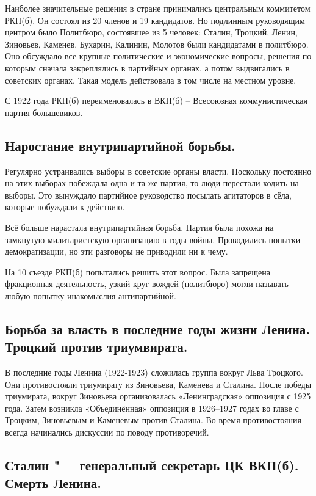 Наиболее значительные решения в стране принимались центральным коммитетом РКП(б). Он состоял из 20 членов и 19 кандидатов. Но подлинным руководящим центром было Политбюро, состоявшее из 5 человек: Сталин, Троцкий, Ленин, Зиновьев, Каменев. Бухарин, Калинин, Молотов были кандидатами в политбюро. Оно обсуждало все крупные политические и экономические вопросы, решения по которым сначала закреплялись в партийных органах, а потом выдвигались в советских органах. Такая модель действовала в том числе на местном уровне.

С 1922 года РКП(б) переименовалась в ВКП(б) – Всесоюзная коммунистическая партия большевиков.

\subsection{Наростание внутрипартийной борьбы.} 

Регулярно устраивались выборы в советские органы власти. Поскольку постоянно на этих выборах побеждала одна и та же партия, то люди перестали ходить на выборы. Это вынуждало партийное руководство посылать агитаторов в сёла, которые побуждали к действию.

Всё больше нарастала внутрипартийная борьба. Партия была похожа на замкнутую милитаристскую организацию в годы войны. Проводились попытки демократизации, но эти разговоры не приводили ни к чему.

На 10 съезде РКП(б) попытались решить этот вопрос. Была запрещена фракционная деятельность, узкий круг вождей (политбюро) могли называть любую попытку инакомыслия антипартийной.

\subsection{Борьба за власть в последние годы жизни Ленина. Троцкий против триумвирата.}

В последние годы Ленина (1922-1923) сложилась группа вокруг Льва Троцкого. Они противостояли триумирату из Зиновьева, Каменева и Сталина. После победы триумирата, вокруг Зиновьева организовалась «Ленинградская» оппозиция с 1925 года. Затем возникла «Объединённая» оппозиция в 1926--1927 годах во главе с Троцким, Зиновьевым и Каменевым против Сталина. Во время противостояния всегда начинались дискуссии по поводу противоречий.

\subsection{Сталин "--- генеральный секретарь ЦК ВКП(б). Смерть Ленина.}

